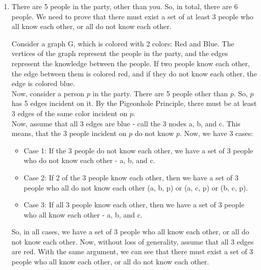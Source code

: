 \documentclass[a4paper]{article}
\begin{document}
\begin{enumerate}
    \newpage

    \item There are 5 people in the party, other than you. So, in total, there are 6 people. We need to prove that there must exist a set of at least 3 people who all know each other, or all do not know each other.
    
    Consider a graph G, which is colored with 2 colors: Red and Blue. The vertices of the graph represent the people in the party, and the edges represent the knowledge between the people. If two people know each other, the edge between them is colored red, and if they do not know each other, the edge is colored blue.\\

    Now, consider a person $p$ in the party. There are 5 people other than $p$. So, $p$ has 5 edges incident on it. By the Pigeonhole Principle, there must be at least 3 edges of the same color incident on $p$.\\

    Now, assume that all 3 edges are blue - call the 3 nodes a, b, and c. This means, that the 3 people incident on $p$ do not know $p$. Now, we have 3 cases:
    \begin{itemize}
        \item Case 1: If the 3 people do not know each other, we have a set of 3 people who do not know each other - a, b, and c.
        \item Case 2: If 2 of the 3 people know each other, then we have a set of 3 people who all do not know each other (a, b, p) or (a, c, p) or (b, c, p).
        \item Case 3: If all 3 people know each other, then we have a set of 3 people who all know each other - a, b, and c.
    \end{itemize}

    So, in all cases, we have a set of 3 people who all know each other, or all do not know each other. Now, without loss of generality, assume that all 3 edges are red. With the same argument, we can see that there must exist a set of 3 people who all know each other, or all do not know each other.\\


\end{enumerate}
\end{document}
